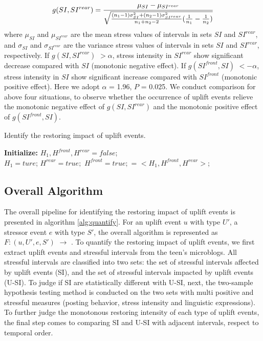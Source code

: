 \begin{equation}
\small{g(SI,SI^{rear})}= \frac{\mu_{SI}-\mu_{SI^{rear}}}{\sqrt{\frac{(n_1-1)\sigma^2_{SI}+(n_2-1)\sigma^2_{SI^{rear}}}{n_1+n_2-2}(\frac{1}{n_1}-\frac{1}{n_2})}}
\end{equation}
where $\mu_{SI}$ and $\mu_{SI^{rear}}$ are the mean stress values of intervals in sets $SI$ and $SI^{rear}$,
and $\sigma_{SI}$ and $\sigma_{SI^{rear}}$ are the variance stress values of intervals in sets $SI$ and $SI^{rear}$, respectively.
If $g(SI,SI^{rear})$ $> \alpha$, stress intensity in $SI^{rear}$ show significant decrease compared with $SI$ (monotonic negative effect).
If $g(SI^{front},SI)$ $< -\alpha$, stress intensity in $SI$ show significant increase compared with $SI^{front}$ (monotonic positive effect).
Here we adopt $\alpha$ = 1.96, $P$ = 0.025.
We conduct comparison for above four situations,
to observe whether the occurrence of uplift events relieve the monotonic negative effect of $g(SI,SI^{rear})$
and the monotonic positive effect of $g(SI^{front},SI)$.
{ \footnotesize%
\begin{algorithm}
  \caption{Identify the restoring impact of uplift events.}
  \label{alg:quantify}
  \textbf{Initialize:}  $H_1, H^{front}, H^{rear} = false$;\\
   {$H_1 = ture$;}
  {
  	$H^{rear} = true;$
  }
  {
  	$H^{front} = true;$
  }
  \Return {} = $<H_1, H^{front}, H^{rear}>$;
\end{algorithm}
}

\subsection{Overall Algorithm}
The overall pipeline for identifying the restoring impact of uplift events is presented in algorithm \ref{alg:quantify}.
For an uplift event $u$ with type $U'$,
a stressor event $e$ with type $S'$,
the overall algorithm is represented as
$F: (u, U', e, S')$ $\rightarrow$ .%
To quantify the restoring impact of uplift events,
we first extract uplift events and stressful intervals from the teen's microblogs.
All stressful intervals are classified into two sets:
the set of stressful intervals affected by uplift events (SI),
and the set of stressful intervals impacted by uplift events (U-SI).
To judge if SI are statistically different with U-SI,
next, the two-sample hypothesis testing method is conducted on the two sets
with multi positive and stressful measures (posting behavior, stress intensity and linguistic expressions).
To further judge the monotonous restoring intensity of each type of uplift events,
the final step comes to comparing SI and U-SI with adjacent intervals, respect to temporal order.

